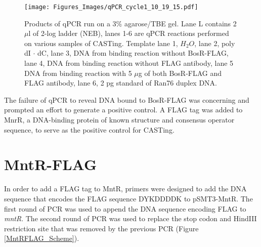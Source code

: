 \documentclass[12pt,twoside]{reedthesis}
\begin{document}
    
    \begin{figure}[h!tbp]
    	\centering
    	\texttt{[image: Figures\_Images/qPCR\_cycle1\_10\_19\_15.pdf]}
    	\caption[qPCR of 1st Cycle of CASTing Gel Analysis]{Products of qPCR run on a 3\% agarose/TBE gel. Lane L contains 2 $\mu$l of 2-log ladder (NEB), lanes 1-6 are qPCR reactions performed on various samples of CASTing. Template lane 1, $H_{2}O$, lane 2, poly dI $\cdot$ dC, lane 3, DNA from binding reaction without BosR-FLAG, lane 4, DNA from binding reaction without FLAG antibody, lane 5 DNA from binding reaction with 5 $\mu$g of both BosR-FLAG and FLAG antibody, lane 6, 2 pg standard of Ran76 duplex DNA.}
    	\label{qPCRcycle1}
    \end{figure}
    
    The failure of qPCR to reveal DNA bound to BosR-FLAG was concerning and prompted an effort to generate a positive control. A FLAG tag was added to MnrR, a DNA-binding protein of known structure and consensus operator sequence, to serve as the positive control for CASTing. 
    
  
    \clearpage

  \section{MntR-FLAG}
  
  
  In order to add a FLAG tag to MntR, primers were designed to add the DNA sequence that encodes the FLAG sequence DYKDDDDK to pSMT3-MntR. The first round of PCR was used to append the DNA sequence encoding FLAG to \textit{mntR}. The second round of PCR was used to replace the stop codon and HindIII restriction site that was removed by the previous PCR (Figure \ref{MntRFLAG_Scheme}). 
  
\end{document}

